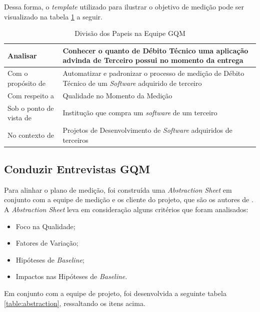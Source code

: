 Dessa forma, o \textit{template} utilizado para ilustrar o objetivo de medição pode ser
visualizado na tabela \ref{table:templateobjetivo} a seguir.
\\

\begin{table}[ht]
\caption{Divisão dos Papeis na Equipe GQM}
\centering
\begin{tabular}{|l|p{7cm}|}
\hline
Analisar & Conhecer o quanto de Débito Técnico uma aplicação advinda de Terceiro
possui no momento da entrega \\
\hline
Com o propósito de & Automatizar e padronizar o processo de medição de Débito
Técnico de um \textit{Software} adquirido de terceiro \\
\hline
Com respeito a & Qualidade no Momento da Medição \\
\hline
Sob o ponto de vista de & Institução que compra um \textit{software} de um terceiro  \\
\hline
No contexto de & Projetos de Desenvolvimento de \textit{Software} adquiridos de terceiros \\
\hline
\end{tabular}
\label{table:templateobjetivo}
\end{table}

\subsection{Conduzir Entrevistas GQM}
Para alinhar o plano de medição, foi construída uma \textit{Abstraction Sheet} em conjunto
com a equipe de medição e os cliente do projeto, que são os autores de \cite{td}.
A \textit{Abstraction Sheet} leva em consideração alguns critérios que foram analisados:

\begin{itemize}
  \item Foco na Qualidade;
  \item Fatores de Variação;
  \item Hipóteses de \textit{Baseline};
  \item Impactos nas Hipóteses de \textit{Baseline}.
\end{itemize}

Em conjunto com a equipe de projeto, foi desenvolvida a seguinte tabela
\ref{table:abstraction}, ressaltando
os itens acima.
\\

